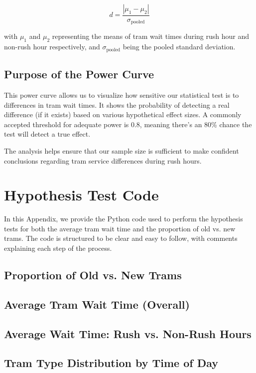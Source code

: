 \documentclass[a4paper, 10pt]{article}
\begin{document}
\begin{appendices}
				\[
				d = \frac{|\mu_1 - \mu_2|}{\sigma_{\text{pooled}}}
				\]

				with \( \mu_1 \) and \( \mu_2 \) representing the means of tram wait times during rush hour and non-rush hour respectively, and \( \sigma_{\text{pooled}} \) being the pooled standard deviation.

			\subsection*{Purpose of the Power Curve}

				This power curve allows us to visualize how sensitive our statistical test is to differences in tram wait times. It shows the probability of detecting a real difference (if it exists) based on various hypothetical effect sizes. A commonly accepted threshold for adequate power is 0.8, meaning there's an 80\% chance the test will detect a true effect.

				\bigskip
				The analysis helps ensure that our sample size is sufficient to make confident conclusions regarding tram service differences during rush hours.
		

		\newpage
		\section{Hypothesis Test Code}
		\label{sec:hypothesis_test_code}
		  \noindent In this Appendix, we provide the Python code used to perform the hypothesis tests for both the average tram wait time and the proportion of old vs. new trams. The code is structured to be clear and easy to follow, with comments explaining each step of the process.

			\subsection*{Proportion of Old vs. New Trams}
					

			\newpage
			\subsection*{Average Tram Wait Time (Overall)}
				

			\newpage
			\subsection*{Average Wait Time: Rush vs. Non-Rush Hours}
				

			\newpage
			\subsection*{Tram Type Distribution by Time of Day}
				
	\end{appendices}
\end{document}
